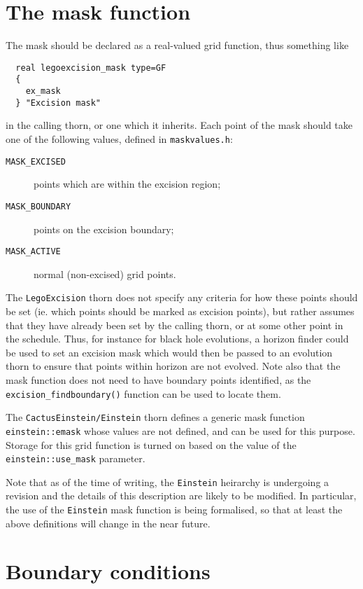 \documentclass{article}
\begin{document}
\section{The mask function}
\label{sec:mask}

The mask should be declared as a real-valued grid function, thus
something like
\begin{verbatim}
  real legoexcision_mask type=GF
  {
    ex_mask
  } "Excision mask"
\end{verbatim}
in the calling thorn, or one which it inherits. Each point of the mask
should take one of the following values, defined in
\texttt{maskvalues.h}:

\begin{description}
  \item[\texttt{MASK\_EXCISED}] points which are within the excision region;
  \item[\texttt{MASK\_BOUNDARY}] points on the excision boundary;
  \item[\texttt{MASK\_ACTIVE}] normal (non-excised) grid points.
\end{description}

The \texttt{LegoExcision} thorn does not specify any criteria for how
these points should be set (ie. which points should be marked as
excision points), but rather assumes that they have already been set by
the calling thorn, or at some other point in the schedule. Thus, for
instance for black hole evolutions, a horizon finder could be used to
set an excision mask which would then be passed to an evolution thorn
to ensure that points within horizon are not evolved. Note also that the
mask function does not need to have boundary points identified, as the
\texttt{excision\_findboundary()} function can be used to locate them.

The \texttt{CactusEinstein/Einstein} thorn defines a generic mask
function \texttt{einstein::emask} whose values are not defined, and
can be used for this purpose. Storage for this grid function is turned
on based on the value of the \texttt{einstein::use\_mask} parameter.

Note that as of the time of writing, the
\texttt{Einstein} heirarchy is undergoing a revision and the details
of this description are likely to be modified. In particular, the use
of the \texttt{Einstein} mask function is being formalised, so that at
least the above definitions will change in the near future.

\section{Boundary conditions}
\end{document}
